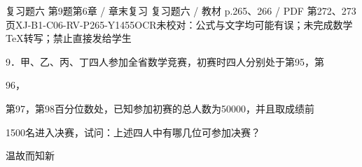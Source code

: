 \begin{bankitem}{复习题六 第9题}{第6章 / 章末复习 复习题六 / 教材 p.265、266 / PDF 第272、273页}{XJ-B1-C06-RV-P265-Y1455}{OCR未校对：公式与文字均可能有误；未完成数学TeX转写；禁止直接发给学生}
\begin{ocrdraft}
\par
9．甲、乙、丙、丁四人参加全省数学竞赛，初赛时四人分别处于第95，第
\par
96，
\par
第97，第98百分位数处，已知参加初赛的总人数为50000，并且取成绩前
\par
1500名进入决赛，试问：上述四人中有哪几位可参加决赛？
\par
[教材p.266 / PDF第273页]
\par
温故而知新
\end{ocrdraft}
\end{bankitem}
